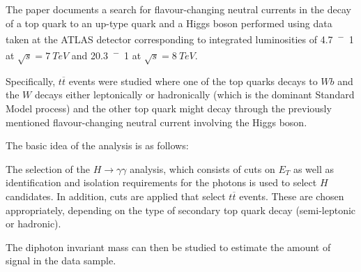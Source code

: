 

\noindent
The paper\cite{aad} documents a search for flavour-changing neutral currents in the decay of a top quark to an up-type quark and a Higgs boson performed using data taken at the ATLAS detector corresponding to integrated luminosities of \SI{4.7}{^-1} at $\sqrt{s} = \SI{7}{TeV}$ and \SI{20.3}{^-1} at $\sqrt{s} = \SI{8}{TeV}$.

Specifically, $t\overline{t}$ events were studied where one of the top quarks decays to $Wb$ and the $W$ decays either leptonically or hadronically (which is the dominant Standard Model process) and the other top quark might decay through the previously mentioned flavour-changing neutral current involving the Higgs boson.

The basic idea of the analysis is as follows:

The selection of the $H\to\gamma \gamma$ analysis, which consists of cuts on $E_T$ as well as identification and isolation requirements for the photons is used to select $H$ candidates.
In addition, cuts are applied that select $t\overline{t}$ events.
These are chosen appropriately, depending on the type of secondary top quark decay (semi-leptonic or hadronic).

The diphoton invariant mass can then be studied to estimate the amount of signal in the data sample.

% 

% 


